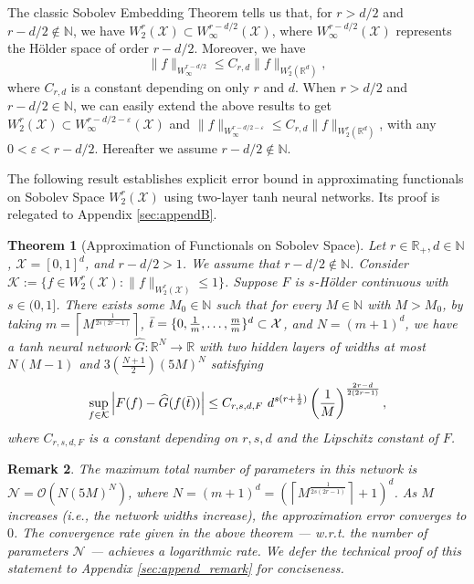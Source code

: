 \documentclass{article}
\def\NN{\mathbb N}
\def\RR{\mathbb R}
\numberwithin{equation}{section}
\newtheorem{theorem}{Theorem}[section]
\newtheorem{remark}[theorem]{Remark}
\begin{document}

The classic Sobolev Embedding Theorem tells us that, for $r>d/2$ and $r-d/2 \notin \NN$, we have $W^r_2(\mathcal{X}) \subset W_\infty^{r-d/2}(\mathcal{X})$, where $W_\infty^{r-d/2}(\mathcal{X})$ represents the H\"older space of order $r-d/2$. 
Moreover, we have
\begin{equation*}
    \|f\|_{W_\infty^{r-d/2}} \leq C_{r,d}  \|f\|_{W^r_2(\RR^d)},
\end{equation*}
where $C_{r,d}$ is a constant depending on only $r$ and $d$.
When $r>d/2$ and $r-d/2 \in \NN$, we can easily extend the above results to get $W^r_2(\mathcal{X}) \subset W_\infty^{r-d/2-\varepsilon}(\mathcal{X})$ and $\|f\|_{W_\infty^{r-d/2 - \varepsilon}} \leq C_{r,d}  \|f\|_{W^r_2(\RR^d)}$, with any $0< \varepsilon < r-d/2$. Hereafter we assume $r-d/2 \notin \NN$.

The following result establishes explicit error bound in approximating functionals on Sobolev Space $W^r_2(\mathcal{X})$  using two-layer tanh neural networks. Its proof is relegated to Appendix \ref{sec:appendB}.

\begin{theorem}[Approximation of Functionals on Sobolev Space]\label{thm:Sobolev}
    Let $r\in \RR_+, d\in \NN$, $\mathcal{X} = [0,1]^d$, and $r-d/2>1$. We assume that $r-d/2 \notin \NN$.  
    Consider $
    \mathcal{K} := \{f\in W^r_2(\mathcal{X}): \|f\|_{W^r_2(\mathcal{X})} \leq 1\}
$. 
Suppose $F$ is  $s$-H\"{o}lder continuous with $s \in (0,1]$. 
    There exists some $M_0\in \NN$ such that for every $M\in \NN$ with $M>M_0$, by taking $m=\left\lceil M^{\frac{1}{2s(2r-1)}}\right\rceil$, $\Bar{t}=\{0, \frac{1}{m},\ldots, \frac{m}{m}\}^d \subset \mathcal{X}$, and $N= (m+1)^d$, we have a tanh neural network $\widehat{G}: \RR^N \to \RR$ with two hidden layers of widths at most $N(M-1)$ and $3\left(\frac{N+1}{2}\right) (5M)^N$ satisfying 
\begin{equation*}
    \sup_{f\in \mathcal{K}}\left|F(f) - \widehat{G}(f(\Bar{t}))\right|\leq C_{r, s, d, F} \ d^{s(r+\frac{1}{2})} \left(\frac{1}{M}\right)^{\frac{2r-d}{2(2r-1)}},
\end{equation*}
where $C_{r, s, d, F}$ is a constant depending on $r, s, d$ and the Lipschitz constant of $F$.
\end{theorem}


\begin{remark}\label{remark:rate_thm3}
The maximum total number of parameters in this network is $\mathcal{N} = \mathcal{O}(N(5M)^N)$, where $N=(m+1)^d = \left(\left\lceil M^{\frac{1}{2s(2r-1)}}\right\rceil +1 \right)^d$. 
As $M$ increases (i.e., the network widths increase), the approximation error converges to $0$. 
The convergence rate given in the above theorem --- w.r.t. the number of parameters $\mathcal{N}$ --- achieves a logarithmic rate. We defer the technical proof of this statement to Appendix \ref{sec:append_remark} for conciseness. 
\end{remark}
\end{document}
